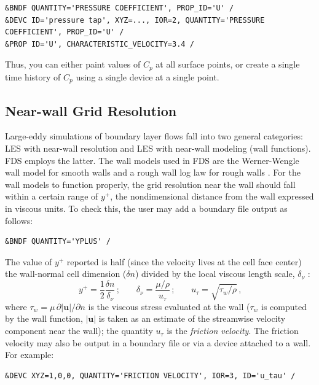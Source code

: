 \documentclass[11pt]{book}
\newcommand{\be}{\begin{equation}}
\newcommand{\ee}{\end{equation}}
\begin{document}
\footnotesize
\begin{verbatim}
&BNDF QUANTITY='PRESSURE COEFFICIENT', PROP_ID='U' /
&DEVC ID='pressure tap', XYZ=..., IOR=2, QUANTITY='PRESSURE COEFFICIENT', PROP_ID='U' /
&PROP ID='U', CHARACTERISTIC_VELOCITY=3.4 /
\end{verbatim}
\normalsize

\noindent
Thus, you can either paint values of $C_p$ at all surface points, or create a single time history of $C_p$ using a single device at a single point.

\subsection{Near-wall Grid Resolution}
\label{info:yplus}

Large-eddy simulations of boundary layer flows fall into two general categories: LES with near-wall resolution and LES with near-wall modeling (wall functions).  FDS employs the latter.  The wall models used in FDS are the Werner-Wengle wall model \cite{Werner:1991} for smooth walls and a rough wall log law for rough walls \cite{Pope:2000}.  For the wall models to function properly, the grid resolution near the wall should fall within a certain range of $y^+$, the nondimensional distance from the wall expressed in viscous units.  To check this, the user may add a boundary file output as follows:

\footnotesize
\begin{verbatim}
&BNDF QUANTITY='YPLUS' /
\end{verbatim}
\normalsize

\noindent
The value of $y^+$ reported is half (since the velocity lives at the cell face center) the wall-normal cell dimension ($\delta n$) divided by the local viscous length scale, $\delta_\nu$ \cite{Pope:2000}:
\be
y^+ = \frac{1}{2} \frac{\delta n}{\delta_\nu} \,\mbox{;} \quad\quad \delta_\nu = \frac{\mu/\rho}{u_\tau} \,\mbox{;} \quad\quad u_\tau = \sqrt{\tau_w/\rho} \,\mbox{,}
\ee
where $\tau_w = \mu\,\partial |\mathbf{u}|/\partial n$ is the viscous stress evaluated at the wall ($\tau_w$ is computed by the wall function, $|\mathbf{u}|$ is taken as an estimate of the streamwise velocity component near the wall); the quantity $u_\tau$ is the \emph{friction velocity}.  The friction velocity may also be output in a boundary file or via a device attached to a wall.  For example:
\footnotesize
\begin{verbatim}
&DEVC XYZ=1,0,0, QUANTITY='FRICTION VELOCITY', IOR=3, ID='u_tau' /
\end{verbatim}
\normalsize
\end{document}
